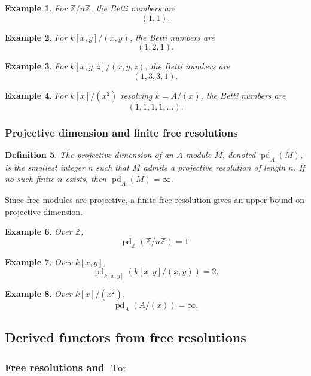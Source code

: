 \documentclass[12pt,a4paper]{article}
\theoremstyle{notespace}
\newtheorem{definition}{Definition}[section]
\DeclareMathOperator{\Tor}{Tor}
\newtheorem{example}[definition]{Example}
\newcommand{\pd}{\operatorname{pd}}
\newcommand{\ZZ}{\mathbb{Z}}
\begin{document}
\begin{example}
	For \(\ZZ/n\ZZ\), the Betti numbers are
	\[
	(1,1).
	\]
\end{example}

\begin{example}
	For \(k[x,y]/(x,y)\), the Betti numbers are
	\[
	(1,2,1).
	\]
\end{example}

\begin{example}
	For \(k[x,y,z]/(x,y,z)\), the Betti numbers are
	\[
	(1,3,3,1).
	\]
\end{example}

\begin{example}
	For \(k[x]/(x^2)\) resolving \(k=A/(x)\), the Betti numbers are
	\[
	(1,1,1,1,\dots).
	\]
\end{example}

\subsubsection{Projective dimension and finite free resolutions}

\begin{definition}
	The \emph{projective dimension} of an \(A\)-module \(M\), denoted \(\pd_A(M)\), is the smallest integer \(n\) such that \(M\) admits a projective resolution of length \(n\). If no such finite \(n\) exists, then \(\pd_A(M)=\infty\).
\end{definition}

Since free modules are projective, a finite free resolution gives an upper bound on projective dimension.

\begin{example}
	Over \(\ZZ\),
	\[
	\pd_\ZZ(\ZZ/n\ZZ)=1.
	\]
\end{example}

\begin{example}
	Over \(k[x,y]\),
	\[
	\pd_{k[x,y]}(k[x,y]/(x,y))=2.
	\]
\end{example}

\begin{example}
	Over \(k[x]/(x^2)\),
	\[
	\pd_A(A/(x))=\infty.
	\]
\end{example}

\subsection{Derived functors from free resolutions}

\subsubsection{Free resolutions and \(\Tor\)}
\end{document}

